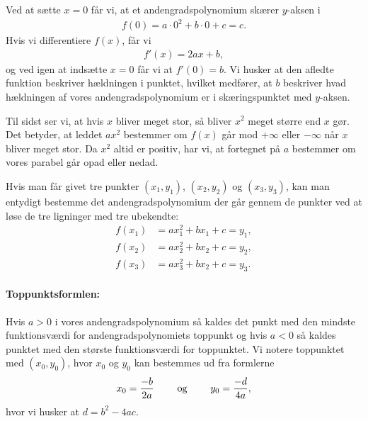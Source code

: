 Ved at sætte $x=0$ får vi, at et andengradspolynomium skærer $y$-aksen i
\begin{align*}
f(0)=a\cdot 0^2 + b \cdot 0 + c = c.
\end{align*}
Hvis vi differentiere $f(x)$, får vi
\begin{align*}
f'(x)=2ax+b,
\end{align*}
og ved igen at indsætte $x=0$ får vi at $f'(0)=b$. Vi husker at den afledte funktion beskriver hældningen i punktet, hvilket medfører, at $b$ beskriver hvad hældningen af vores andengradspolynomium er i skæringspunktet med $y$-aksen.

Til sidst ser vi, at hvis $x$ bliver meget stor, så bliver $x^2$ meget større end $x$ gør. Det betyder, at leddet $ax^2$ bestemmer om $f(x)$ går mod $+ \infty$ eller $-\infty$ når $x$ bliver meget stor. Da $x^2$ altid er positiv, har vi, at fortegnet på $a$ bestemmer om vores parabel går opad eller nedad. 

Hvis man får givet tre punkter $(x_1,y_1)$, $(x_2,y_2)$ og $(x_3,y_3)$, kan man entydigt bestemme det andengradspolynomium der går gennem de punkter ved at løse de tre ligninger med tre ubekendte:
\begin{align*}
f(x_1)&=ax_1^2+bx_1+c = y_1, \\
f(x_2)&=ax_2^2+bx_2+c = y_2, \\
f(x_3)&=ax_3^2+bx_2+c = y_3.
\end{align*}

\paragraph*{Toppunktsformlen:}
Hvis $a > 0$ i vores andengradspolynomium så kaldes det punkt med den mindste funktionsværdi for andengradspolynomiets toppunkt og hvis $a < 0$ så kaldes punktet med den største funktionsværdi for toppunktet. Vi notere toppunktet med $(x_0,y_0)$, hvor $x_0$ og $y_0$ kan bestemmes ud fra formlerne
\begin{align*}
x_0 = \frac{-b}{2a} \qquad \textup{ og } \qquad y_0=\frac{-d}{4a},
\end{align*}
hvor vi husker at $d=b^2-4ac$.


